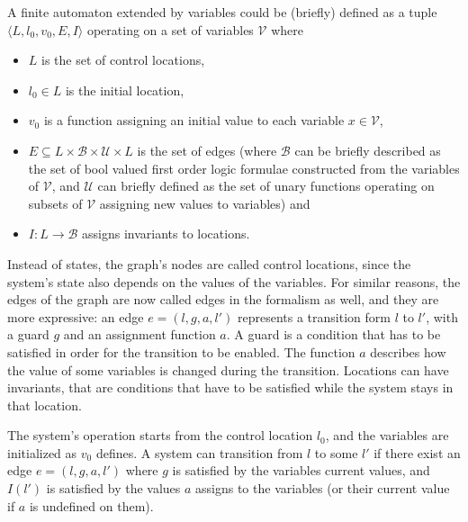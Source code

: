 \begin{dfn}
A finite automaton extended by variables could be (briefly) defined as a tuple $\langle L,l_0,v_0, E, I\rangle$ operating on a set of variables $\mathcal{V}$ where
\begin{itemize}
	\item $L$ is the set of control locations,
	\item $l_0 \in L$ is the initial location,
	\item $v_0$ is a function assigning an initial value to each variable $x \in \mathcal{V}$,
	\item $E \subseteq L \times \mathcal{B} \times \mathcal{U} \times L$ is the set of edges (where $\mathcal{B}$ can be briefly described as the set of bool valued first order logic formulae constructed from the variables of $\mathcal{V}$,  and $\mathcal{U}$ can briefly defined as the set of unary functions operating on subsets of $\mathcal{V}$  assigning new values to variables) and
	\item $I: L \to \mathcal{B}$ assigns invariants to locations.
\end{itemize}
\end{dfn}

Instead of states, the graph's nodes are called control locations, since the system's state also depends on the values of the variables. For similar reasons, the edges of the graph are now called edges in the formalism as well, and they are more expressive: an edge $e=(l,g,a,l')$ represents a transition form $l$ to $l'$, with a guard $g$ and an assignment function $a$. A guard is a condition that has to be satisfied in order for the transition to be enabled. The function $a$ describes how the value of some variables is changed during the transition. Locations can have invariants, that are conditions that have to be satisfied while the system stays in that location.

The system's operation starts from the control location $l_0$, and the variables are initialized as $v_0$ defines. A system can transition from $l$ to some $l'$ if there exist an edge $e=(l,g,a,l')$ where $g$ is satisfied by the variables current values, and $I(l')$ is satisfied by the values $a$ assigns to the variables (or their current value if $a$ is undefined on them).

